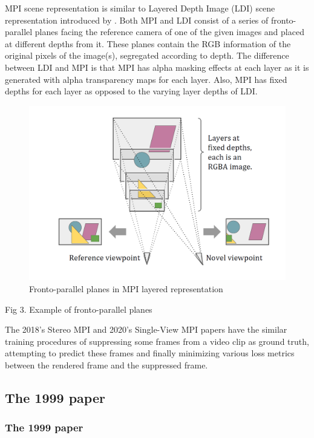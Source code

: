 MPI scene representation is similar to Layered Depth Image (LDI) scene representation introduced by \cite{layered_depth_images}. Both MPI and LDI consist of a series of fronto-parallel planes facing the reference camera of one of the given images and placed at different depths from it. These planes contain the RGB information of the original pixels of the image(s), segregated according to depth. The difference between LDI and MPI is that MPI has alpha masking effects at each layer as it is generated with alpha transparency maps for each layer. Also, MPI has fixed depths for each layer as opposed to the varying layer depths of LDI. 

\begin{figure}[!h]
    \includegraphics[width=1\columnwidth]{figures/mpi-layered-representation.png}
    \caption{Fronto-parallel planes in MPI layered representation}
    \label{fig:mpi-layered-representation}
\end{figure}
Fig 3. Example of fronto-parallel planes

The 2018's Stereo MPI and 2020's Single-View MPI papers have the similar training procedures of suppressing some frames from a video clip as ground truth, attempting to predict these frames and finally minimizing various loss metrics between the rendered frame and the suppressed frame.

\subsection{The 1999 paper}\label{subsec2:1999}
\subsubsection{The 1999 paper}\label{subsubsec2:1999}

